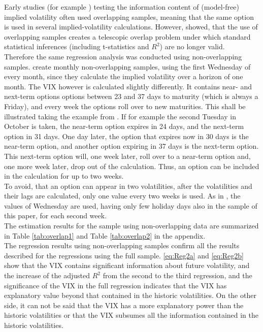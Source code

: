 Early studies (for example \textcite{canina1993}) testing the information content of (model-free) implied volatility often used overlapping samples, meaning that the same option is used in several implied-volatility calculations. However, \textcite{christensen2001} showed, that the use of overlapping samples creates a telescopic overlap problem under which standard statistical inferences (including t-statistics and $R^{2}$) are no longer valid.\\
Therefore the same regression analysis was conducted using non-overlapping samples. \textcite{jiang2003} create monthly non-overlapping samples, using the first Wednesday of every month, since they calculate the implied volatility over a horizon of one month. The VIX however is calculated slightly differently. It contains near- and next-term options options between 23 and 37 days to maturity (which is always a Friday), and every week the options roll over to new maturities. This shall be illustrated taking the example from \textcite{exchange2009}. If for example the second Tuesday in October is taken, the near-term option expires in 24 days, and the next-term option in 31 days. One day later, the option that expires now in 30 days is the near-term option, and another option expiring in 37 days is the next-term option. This next-term option will, one week later, roll over to a near-term option and, one more week later, drop out of the calculation. Thus, an option can be included in the calculation for up to two weeks. \\
To avoid, that an option can appear in two volatilities, after the volatilities and their lags are calculated, only one value every two weeks is used. As in \textcite{jiang2003}, the values of Wednesday are used, having only few holiday days also in the sample of this paper, for each second week.\\
The estimation results for the sample using non-overlapping data are summarized in Table \ref{tab:overlap1} and Table \ref{tab:overlap2} in the appendix.\\
The regression results using non-overlapping samples confirm all the results described for the regressions using the full sample. \ref{eq:Reg2a} and \ref{eq:Reg2b} show that the VIX contains significant information about future volatility, and the increase of the adjusted $R^{2}$ from the second to the third regression, and the significance of the VIX in the full regression indicates that the VIX has explanatory value beyond that contained in the historic volatilities. On the other side, it can not be said that the VIX has a more explanatory power than the historic volatilities or that the VIX subsumes all the information contained in the historic volatilities.\\
